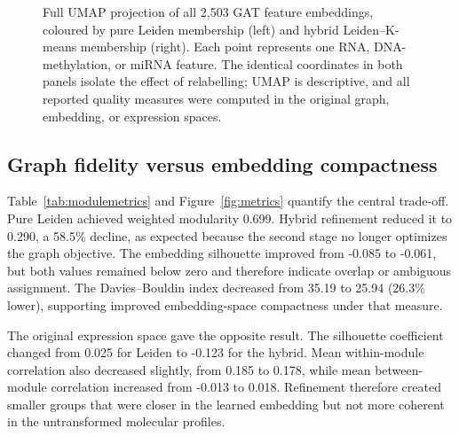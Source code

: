 \documentclass[11pt]{article}
\begin{document}
\begin{figure}[t]
{
    }
    \caption{Full UMAP projection of all 2,503 GAT feature embeddings, coloured by pure Leiden membership (left) and hybrid Leiden--K-means membership (right). Each point represents one RNA, DNA-methylation, or miRNA feature. The identical coordinates in both panels isolate the effect of relabelling; UMAP is descriptive, and all reported quality measures were computed in the original graph, embedding, or expression spaces.}
    \label{fig:umap}
\end{figure}

\subsection{Graph fidelity versus embedding compactness}

Table~\ref{tab:modulemetrics} and Figure~\ref{fig:metrics} quantify the central trade-off. Pure Leiden achieved weighted modularity 0.699. Hybrid refinement reduced it to 0.290, a 58.5\% decline, as expected because the second stage no longer optimizes the graph objective. The embedding silhouette improved from -0.085 to -0.061, but both values remained below zero and therefore indicate overlap or ambiguous assignment. The Davies--Bouldin index decreased from 35.19 to 25.94 (26.3\% lower), supporting improved embedding-space compactness under that measure.

The original expression space gave the opposite result. The silhouette coefficient changed from 0.025 for Leiden to -0.123 for the hybrid. Mean within-module correlation also decreased slightly, from 0.185 to 0.178, while mean between-module correlation increased from -0.013 to 0.018. Refinement therefore created smaller groups that were closer in the learned embedding but not more coherent in the untransformed molecular profiles.
\end{document}
